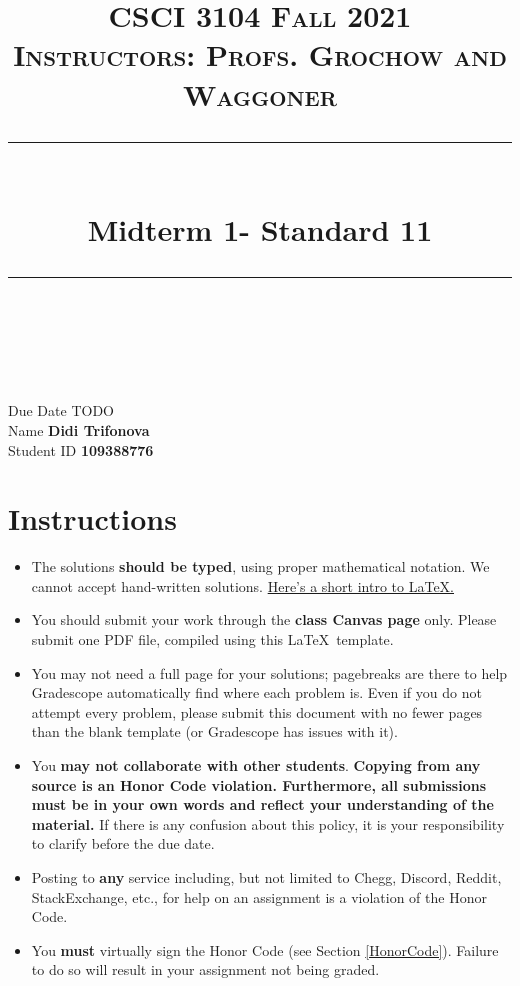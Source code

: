 \documentclass[11pt]{article}
\title{
\normalfont \normalsize 
\textsc{CSCI 3104 Fall 2021 \\ 
Instructors: Profs. Grochow and Waggoner} \\
[10pt] 
\rule{\linewidth}{0.5pt} \\[6pt] 
\huge Midterm 1- Standard 11 \\
\rule{\linewidth}{2pt}  \\[10pt]
}
\date{}
\theoremstyle{definition}
\theoremstyle{definition}
\theoremstyle{definition}
\begin{document}

\maketitle


\noindent
Due Date \dotfill TODO \\
Name \dotfill \textbf{Didi Trifonova} \\
Student ID \dotfill \textbf{109388776} \\


\tableofcontents

\section{Instructions}
 \begin{itemize}
	\item The solutions \textbf{should be typed}, using proper mathematical notation. We cannot accept hand-written solutions. \href{http://ece.uprm.edu/~caceros/latex/introduction.pdf}{Here's a short intro to \LaTeX.}
	\item You should submit your work through the \textbf{class Canvas page} only. Please submit one PDF file, compiled using this \LaTeX \ template.
	\item You may not need a full page for your solutions; pagebreaks are there to help Gradescope automatically find where each problem is. Even if you do not attempt every problem, please submit this document with no fewer pages than the blank template (or Gradescope has issues with it).

	\item You \textbf{may not collaborate with other students}. \textbf{Copying from any source is an Honor Code violation. Furthermore, all submissions must be in your own words and reflect your understanding of the material.} If there is any confusion about this policy, it is your responsibility to clarify before the due date. 

	\item Posting to \textbf{any} service including, but not limited to Chegg, Discord, Reddit, StackExchange, etc., for help on an assignment is a violation of the Honor Code.

	\item You \textbf{must} virtually sign the Honor Code (see Section \ref{HonorCode}). Failure to do so will result in your assignment not being graded.
\end{itemize}
\end{document}
